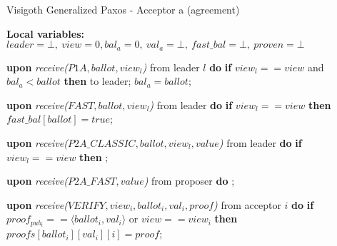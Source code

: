 \begin{algorithm} 
	\caption{Visigoth Generalized Paxos - Acceptor a (agreement)}
	\label{VFT-Acc}
	\textbf{Local variables:} $leader = \bot,\ view = 0, bal_a = 0,\ val_a = \bot,\ fast\_bal = \bot,\ proven = \bot$
	\begin{algorithmic}[1]
		\State \textbf{upon} \textit{receive($P1A, ballot, view_l$)} from leader $l$ \textbf{do}
		\State \hspace{\algorithmicindent} \textbf{if} $view_l == view$ and $bal_a < ballot$ \textbf{then}
		\State \hspace{\algorithmicindent}\hspace{\algorithmicindent}  to leader;
		\State \hspace{\algorithmicindent}\hspace{\algorithmicindent} $bal_a = ballot$;
		
		\State
		\State \textbf{upon} \textit{receive($FAST,ballot,view_l$)} from leader \textbf{do}
		\State \hspace{\algorithmicindent} \textbf{if} $view_l == view$ \textbf{then}
		\State \hspace{\algorithmicindent}\hspace{\algorithmicindent} $fast\_bal[ballot] = true$;
		
		\State
		\State \textbf{upon} \textit{receive($P2A\_CLASSIC, ballot, view_l, value$)} from leader \textbf{do}
		\State \hspace{\algorithmicindent} \textbf{if} $view_l == view$ \textbf{then}
		\State \hspace{\algorithmicindent}\hspace{\algorithmicindent} ; 
		
		\State		
		\State \textbf{upon} \textit{receive($P2A\_FAST, value$)} from proposer \textbf{do}
		\State \hspace{\algorithmicindent} ;
		
		\State
		\State \textbf{upon} \textit{receive($VERIFY,view_i, ballot_i,val_i,proof$)} from acceptor $i$ \textbf{do}
		\State \hspace{\algorithmicindent} \textbf{if} $proof_{pub_i} == \langle ballot_i, val_i \rangle$ or $view == view_i$ \textbf{then}
		\State \hspace{\algorithmicindent}\hspace{\algorithmicindent} $proofs[ballot_i][val_i][i] = proof$;
		

\end{algorithmic}
\end{algorithm}
